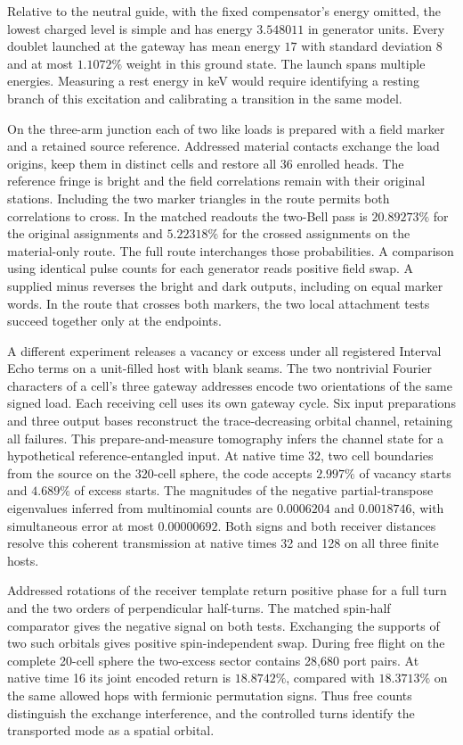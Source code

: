 Relative to the neutral guide, with the fixed compensator's energy
omitted, the lowest charged level is simple and has energy $3.548011$
in generator units. Every doublet launched at the gateway has mean
energy $17$ with standard deviation $8$ and at most $1.1072\%$ weight
in this ground state. The launch spans multiple energies. Measuring a
rest energy in keV would require identifying a resting branch of this
excitation and calibrating a transition in the same model.

On the three-arm junction each of two like loads is prepared with a
field marker and a retained source reference. Addressed material
contacts exchange the load origins, keep them in distinct cells and
restore all 36 enrolled heads. The reference fringe is bright and the
field correlations remain with their original stations. Including the
two marker triangles in the route permits both correlations to cross.
In the matched readouts the two-Bell pass is $20.89273\%$ for the
original assignments and $5.22318\%$ for the crossed assignments on the
material-only route. The full route interchanges those probabilities.
A comparison using identical pulse counts for each generator reads
positive field swap. A supplied minus reverses the bright and dark
outputs, including on equal marker words. In the route that crosses
both markers, the two local attachment tests succeed together only
at the endpoints.

A different experiment releases a vacancy or excess under all registered
Interval Echo terms on a unit-filled host with blank seams. The two
nontrivial Fourier characters of a cell's three gateway addresses encode
two orientations of the same signed load. Each receiving cell uses its own
gateway cycle. Six input preparations and three output bases reconstruct
the trace-decreasing orbital channel, retaining all failures. This
prepare-and-measure tomography infers the channel state for a hypothetical
reference-entangled input. At native
time 32, two cell boundaries from the source on the 320-cell sphere, the
code accepts $2.997\%$ of vacancy starts and $4.689\%$ of excess starts.
The magnitudes of the negative partial-transpose eigenvalues inferred from
multinomial counts are $0.0006204$ and $0.0018746$, with simultaneous error
at most $0.00000692$. Both signs and both receiver distances resolve this
coherent transmission at native times 32 and 128 on all three finite hosts.

Addressed rotations of the receiver template return positive phase for
a full turn and the two orders of perpendicular half-turns. The
matched spin-half comparator gives the negative signal on both tests.
Exchanging the supports of two such orbitals gives positive
spin-independent swap. During free flight on the complete 20-cell sphere
the two-excess sector contains
28,680 port pairs. At native time 16 its joint encoded return is
$18.8742\%$, compared with $18.3713\%$ on the same allowed hops with
fermionic permutation signs. Thus free counts distinguish the exchange
interference, and the controlled turns identify the transported mode
as a spatial orbital.

